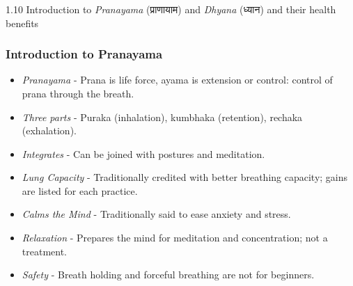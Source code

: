


\begin{frame}[fragile]\frametitle{}
\begin{center}
{\Large 1.10 Introduction to \textit{Pranayama} (प्राणायाम) and \textit{Dhyana} (ध्यान) and their health benefits}
\end{center}
\end{frame}

\begin{frame}[fragile]\frametitle{Introduction to Pranayama}

  \begin{itemize}
	\item \textit{Pranayama} - Prana is life force, ayama is extension or control: control of prana through the breath.
	\item \textit{Three parts} - Puraka (inhalation), kumbhaka (retention), rechaka (exhalation).
	\item \textit{Integrates} - Can be joined with postures and meditation.
	\item \textit{Lung Capacity} - Traditionally credited with better breathing capacity; gains are listed for each practice.
	\item \textit{Calms the Mind} - Traditionally said to ease anxiety and stress.
	\item \textit{Relaxation} - Prepares the mind for meditation and concentration; not a treatment.
	\item \textit{Safety} - Breath holding and forceful breathing are not for beginners.
  \end{itemize}

\end{frame}



